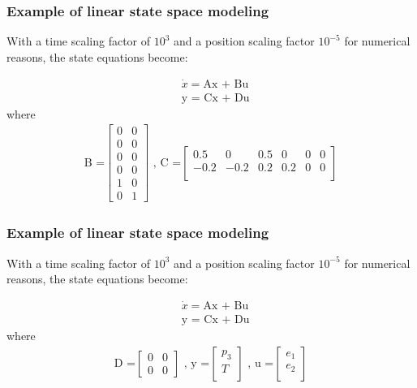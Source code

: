 \begin{frame}
	\frametitle{Example of linear state space modeling}
With a time scaling factor of $10^3$ and a position scaling factor $10^{−5}$ for numerical reasons, the state equations become:
\vspace{-2ex}

        \begin{align*}
		&\dot{x} = \text{Ax + Bu}\\
				&\text{y = Cx + Du}
		\end{align*}
\vspace{0.1cm}
where
\begin{align*}
{
\text{B =}\begin{bmatrix} 
0 & 0 \\
0 & 0 \\
0 & 0  \\
0 & 0  \\
1 & 0  \\
0 & 1  
\end{bmatrix}
\text{ , C =}\begin{bmatrix} 
0.5 & 0 & 0.5 & 0 & 0 & 0 \\
-0.2 & -0.2 & 0.2 & 0.2 & 0 & 0\\
\end{bmatrix}
}
\end{align*}
\end{frame}
\begin{frame}
	\frametitle{Example of linear state space modeling}
With a time scaling factor of $10^3$ and a position scaling factor $10^{−5}$ for numerical reasons, the state equations become:
\vspace{-2ex}

        \begin{align*}
		&\dot{x} = \text{Ax + Bu}\\
				&\text{y = Cx + Du}
		\end{align*}
\vspace{0.1cm}
where
\begin{align*}
{
\text{D =}\begin{bmatrix} 
0 & 0 \\
0 & 0 
\end{bmatrix}
\text{ , y =}\begin{bmatrix} 
p_3 \\
T\\
\end{bmatrix}
\text{ , u =}\begin{bmatrix} 
e_1 \\
e_2\\
\end{bmatrix}
}
\end{align*}
\end{frame}

